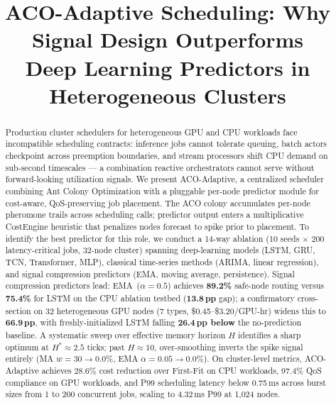 \documentclass[conference]{IEEEtran}
\begin{document}
\title{ACO-Adaptive Scheduling: Why Signal Design Outperforms\\
       Deep Learning Predictors in Heterogeneous Clusters}

\author{
}

\maketitle

\begin{abstract}
Production cluster schedulers for heterogeneous GPU and CPU workloads
face incompatible scheduling contracts: inference jobs cannot tolerate
queuing, batch actors checkpoint across preemption boundaries, and stream
processors shift CPU demand on sub-second timescales --- a combination
reactive orchestrators cannot serve without forward-looking utilization
signals. We present ACO-Adaptive, a centralized scheduler combining Ant
Colony Optimization with a pluggable per-node predictor module for
cost-aware, QoS-preserving job placement. The ACO colony accumulates
per-node pheromone trails across scheduling calls; predictor output enters
a multiplicative CostEngine heuristic that penalizes nodes forecast to
spike prior to placement. To identify the best predictor for this role, we
conduct a 14-way ablation (10 seeds $\times$ 200 latency-critical jobs,
32-node cluster) spanning deep-learning models (LSTM, GRU, TCN,
Transformer, MLP), classical time-series methods (ARIMA, linear
regression), and signal compression predictors (EMA, moving average,
persistence). Signal compression predictors lead: EMA~($\alpha{=}0.5$) achieves
\textbf{89.2\%} safe-node routing versus \textbf{75.4\%} for LSTM on
the CPU ablation testbed (\textbf{13.8\,pp} gap); a confirmatory
cross-section on 32 heterogeneous GPU nodes (7 types,
\$0.45--\$3.20/GPU-hr) widens this to \textbf{66.9\,pp}, with
freshly-initialized LSTM falling \textbf{26.4\,pp below} the
no-prediction baseline. A systematic sweep over effective memory horizon $H$
identifies a sharp optimum at $H^{*}{\approx}2.5$ ticks; past
$H{\approx}10$, over-smoothing inverts the spike signal entirely
(MA $w{=}30 \to 0.0\%$, EMA $\alpha{=}0.05 \to 0.0\%$). On
cluster-level metrics, ACO-Adaptive achieves 28.6\% cost reduction over
First-Fit on CPU workloads, 97.4\% QoS compliance on GPU workloads, and
P99 scheduling latency below 0.75\,ms across burst sizes from 1 to 200
concurrent jobs, scaling to 4.32\,ms P99 at 1{,}024 nodes.
\end{abstract}
\end{document}
